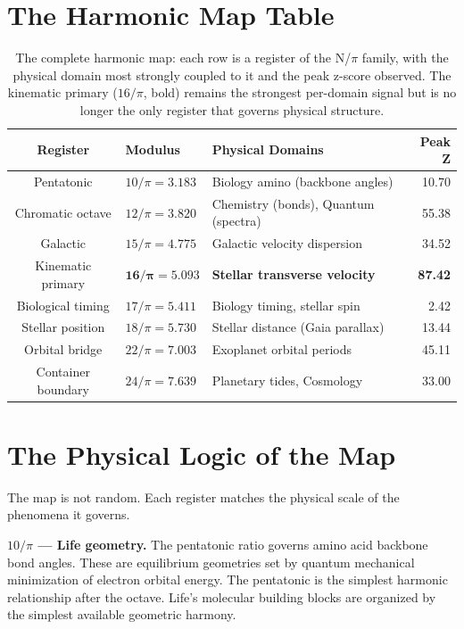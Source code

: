 \documentclass[11pt, letterpaper, openany]{book}
\begin{document}
\section*{The Harmonic Map Table}

\begin{table}[H]
\centering
\renewcommand{\arraystretch}{1.5}
\begin{tabular}{|c|l|l|r|}
\hline
\textbf{Register} & \textbf{Modulus} & \textbf{Physical Domains} & \textbf{Peak Z} \\
\hline\hline
Pentatonic & $10/\pi = 3.183$ & Biology amino (backbone angles) & 10.70 \\
Chromatic octave & $12/\pi = 3.820$ & Chemistry (bonds), Quantum (spectra) & 55.38 \\
Galactic & $15/\pi = 4.775$ & Galactic velocity dispersion & 34.52 \\
Kinematic primary & $\mathbf{16/\pi = 5.093}$ & \textbf{Stellar transverse velocity} & \textbf{87.42} \\
Biological timing & $17/\pi = 5.411$ & Biology timing, stellar spin & 2.42 \\
Stellar position & $18/\pi = 5.730$ & Stellar distance (Gaia parallax) & 13.44 \\
Orbital bridge & $22/\pi = 7.003$ & Exoplanet orbital periods & 45.11 \\
Container boundary & $24/\pi = 7.639$ & Planetary tides, Cosmology & 33.00 \\
\hline
\end{tabular}
\caption{The complete harmonic map: each row is a register of the N/$\pi$ family, with the physical domain most strongly coupled to it and the peak z-score observed.
The kinematic primary ($16/\pi$, bold) remains the strongest per-domain signal but is no longer the only register that governs physical structure.}
\label{tab:harmonic_map}
\end{table}

\section*{The Physical Logic of the Map}

The map is not random.
Each register matches the physical scale of the phenomena it governs.

\textbf{$10/\pi$ --- Life geometry.}
The pentatonic ratio governs amino acid backbone bond angles.
These are equilibrium geometries set by quantum mechanical minimization of electron orbital energy.
The pentatonic is the simplest harmonic relationship after the octave. Life's molecular building blocks are organized by the simplest available geometric harmony.
\end{document}
